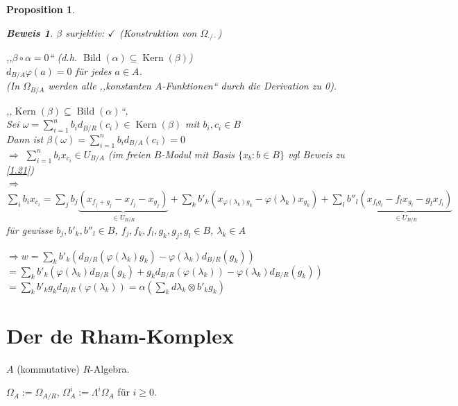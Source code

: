 \documentclass[a4paper,12pt]{scrbook}
\theoremstyle{break}
\newtheorem{Prop}[Def]{Proposition}
\theoremstyle{nonumberbreak}
\newtheorem{Bew}{Beweis}
\theoremstyle{nonumberplain}
\DeclareMathOperator{\Kern}{Kern}
\DeclareMathOperator{\Bild}{Bild}
\begin{document}
\begin{Prop}
\begin{enumerate}
\begin{Bew}
$\beta$ surjektiv: $\checkmark$ (Konstruktion von $\Omega_{\cdot/\cdot}$)

,,$\beta \circ \alpha = 0$`` (d.h. $\Bild(\alpha) \subseteq \Kern(\beta)$)\\
$d_{B/A}\varphi(a) = 0$ für jedes $a \in A$. \\
(In $\Omega_{B/A}$ werden alle ,,konstanten $A$-Funktionen`` durch die Derivation zu 0).

,,$\Kern(\beta) \subseteq \Bild(\alpha)$``,\\
Sei $\omega = \sum_{i=1}^n{b_i} d_{B/R}(c_i) \in \Kern(\beta)$ mit $b_i,c_i \in B$\\
Dann ist $\beta(\omega) = \sum_{i=1}^n{b_i d_{B/A}}(c_i) = 0$\\
$\Rightarrow$ $\sum_{i=1}^n{b_i x_{c_i}} \in U_{B/A}$ (im freien $B$-Modul mit Basis $\{ x_b : b \in B \}$ vgl Beweis zu \ref{1.21})\\
$\Rightarrow$ $\sum_i b_i x_{c_i} = \sum_j b_j \underbrace{(x_{f_j + g_j} - x_{f_j} - x_{g_j})}_{\in U_{B/R}} + \sum_k b'_k (x_{\varphi(\lambda_k) g_k} - \varphi(\lambda_k) x_{g_k}) + \sum_l b''_l \underbrace{(x_{f_l g_l} - f_l x_{g_l} - g_l x_{f_l})}_{\in U_{B/R}}$ für gewisse $b_j, b'_k, b''_l \in B$, $f_j,f_k,f_l,g_k,g_j,g_l \in B$, $\lambda_k \in A$

$\Rightarrow w = \sum_k b'_k (d_{B/R}(\varphi(\lambda_k) g_k) - \varphi(\lambda_k) d_{B/R}(g_k))$\\
$= \sum_k b'_k (\varphi(\lambda_k) d_{B/R}(g_k) + g_k d_{B/R}(\varphi(\lambda_k)) - \varphi(\lambda_k) d_{B/R}(g_k))$\\
$= \sum_k b'_k g_k d_{B/R}(\varphi(\lambda_k))
 = \alpha(\sum_k d\lambda_k \otimes b'_k g_k)$
\end{Bew}
\end{enumerate}
\end{Prop}
\section{Der de Rham-Komplex}

$A$ (kommutative) $R$-Algebra.

$\Omega_A := \Omega_{A/R}$, $\Omega^i_A := \Lambda^i\Omega_A$ für $i \geq 0$.
\end{document}
